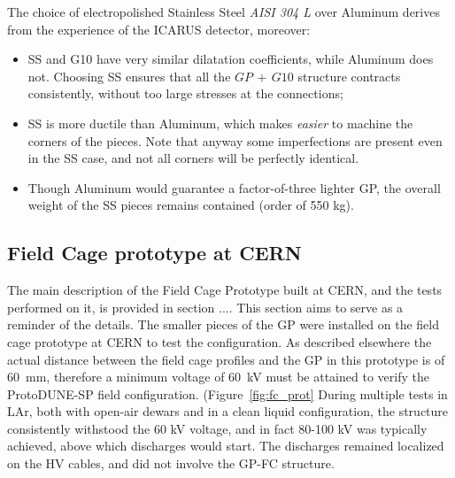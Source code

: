 The choice of electropolished Stainless Steel \textit{AISI 304 L} over Aluminum derives from the experience of the ICARUS detector, moreover:
\begin{itemize}
\item SS and G10 have very similar dilatation coefficients, while Aluminum does not. Choosing SS ensures that all the $GP\,+\,G10$ structure contracts consistently, without too large stresses at the connections; 
\item SS is more ductile than Aluminum, which makes \textit{easier} to machine the corners of the pieces. Note that anyway some imperfections are present even in the SS case, and not all corners will be perfectly identical. 
\item Though Aluminum would guarantee a factor-of-three lighter GP, the overall weight of the SS pieces remains contained (order of 550 kg). 
\end{itemize}

\subsection{Field Cage prototype at CERN}

The main description of the Field Cage Prototype built at CERN, and the tests performed on it, is provided in section .... This section aims to serve as a reminder of the details.
The smaller pieces of the GP were installed on the field cage prototype at CERN to test the configuration. As described elsewhere  the actual distance between the field cage profiles and the GP in this prototype is of 60~mm, therefore a  minimum voltage of 60~kV must be attained to verify the ProtoDUNE-SP field configuration. (Figure~\ref{fig:fc_prot}  During multiple tests in LAr, both with open-air dewars   and in a clean liquid configuration, the structure consistently withstood the 60 kV voltage, and in fact 80-100 kV was typically achieved, above which discharges would start. The discharges remained localized on the HV cables, and did not involve the GP-FC structure.

